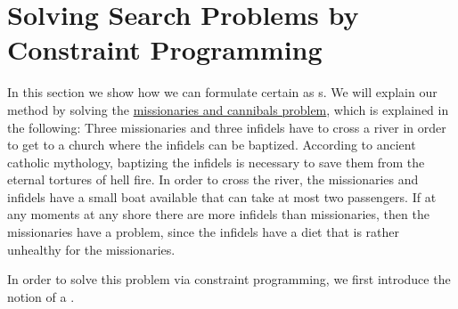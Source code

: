 \section{Solving Search Problems by Constraint Programming}
In this section we show how we can formulate certain  as s.
We will explain our method by solving the
\href{https://en.wikipedia.org/wiki/Missionaries_and_cannibals_problem}{missionaries and cannibals problem},
which is explained in the following:
Three missionaries and three infidels have to cross a river in order to get to a church where the infidels can
be baptized.  According to ancient catholic mythology, baptizing the infidels is necessary to save them from
the eternal tortures of hell fire. In order to cross the river, the missionaries and infidels have a small boat
available that can take at most two passengers. If at any moments at any shore there are more infidels than
missionaries, then the missionaries have a problem, since the infidels have a diet that is rather unhealthy for
the missionaries. 

In order to solve this problem via constraint programming, we first introduce the notion of a
.

